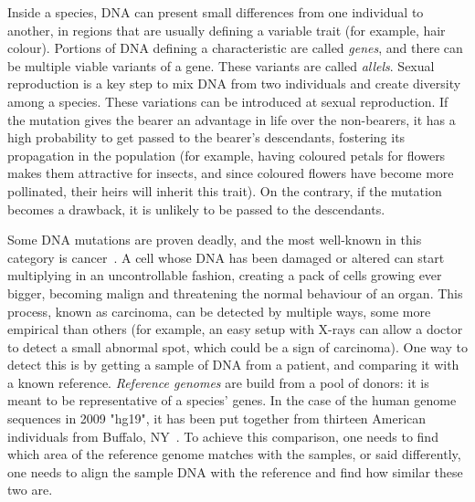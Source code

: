 Inside a species, DNA can present small differences from one individual to another, in regions that are usually defining a variable trait (for example, hair colour). Portions of DNA defining a characteristic are called \emph{genes}, and there can be multiple viable variants of a gene. These variants are called \emph{allels}. Sexual reproduction is a key step to mix DNA from two individuals and create diversity among a species. These variations can be introduced at sexual reproduction. If the mutation gives the bearer an advantage in life over the non-bearers, it has a high probability to get passed to the bearer's descendants, fostering its propagation in the population (for example, having coloured petals for flowers makes them attractive for insects, and since coloured flowers have become more pollinated, their heirs will inherit this trait). On the contrary, if the mutation becomes a drawback, it is unlikely to be passed to the descendants.

Some DNA mutations are proven deadly, and the most well-known in this category is cancer~\cite{misc:diseases}. A cell whose DNA has been damaged or altered can start multiplying in an uncontrollable fashion, creating a pack of cells growing ever bigger, becoming malign and threatening the normal behaviour of an organ. This process, known as carcinoma, can be detected by multiple ways, some more empirical than others (for example, an easy setup with X-rays can allow a doctor to detect a small abnormal spot, which could be a sign of carcinoma). One way to detect this is by getting a sample of DNA from a patient, and comparing it with a known reference. \emph{Reference genomes} are build from a pool of donors: it is meant to be representative of a species' genes. In the case of the human genome sequences in 2009 "hg19", it has been put together from thirteen American individuals from Buffalo, NY~\cite{referencegenome}.
To achieve this comparison, one needs to find which area of the reference genome matches with the samples, or said differently, one needs to align the sample DNA with the reference and find how similar these two are.



